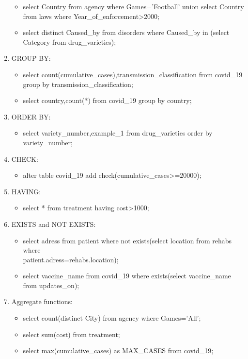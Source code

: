 \documentclass{report}
\begin{document}
\begin{enumerate}
\begin{itemize}
        \item select Country from agency where Games='Football' union select Country from laws where Year\_of\_enforcement>2000;
        \item select distinct Caused\_by from disorders where Caused\_by in (select Category from drug\_varieties);
    \end{itemize}
\item GROUP BY:
    \begin{itemize}
        \item select count(cumulative\_cases),transmission\_classification from covid\_19 group by transmission\_classification;
        \item select country,count(*) from covid\_19 group by country;
    \end{itemize}
\item ORDER BY:
    \begin{itemize}
        \item select variety\_number,example\_1 from drug\_varieties order by variety\_number;
    \end{itemize}
\item CHECK:
    \begin{itemize} 
        \item alter table covid\_19 add check(cumulative\_cases>=20000);
    \end{itemize}
\item HAVING:
    \begin{itemize}
        \item select * from treatment having cost>1000;
    \end{itemize}
\item EXISTS and NOT EXISTS:
    \begin{itemize}
        \item select adress from patient where not exists(select location from rehabs where\\
                patient.adress=rehabs.location);
        \item select vaccine\_name from covid\_19 where exists(select vaccine\_name from updates\_on);
    \end{itemize}
\item Aggregate functions:
    \begin{itemize}
        \item select count(distinct City) from agency where Games='All';
        \item select sum(cost) from treatment;
        \item select max(cumulative\_cases) as MAX\_CASES from covid\_19;

\end{itemize}
\end{enumerate}
\end{document}
